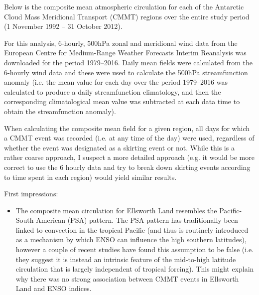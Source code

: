 Below is the composite mean atmospheric circulation for each of the Antarctic Cloud Mass Meridional Transport (CMMT) regions over the entire study period (1 November 1992 -- 31 October 2012).

For this analysis, 6-hourly, 500hPa zonal and meridional wind data from the European Centre for Medium-Range Weather Forecasts Interim Reanalysis \citep[ERA-Interim;][]{Dee2011} was downloaded for the period 1979--2016. Daily mean fields were calculated from the 6-hourly wind data and these were used to calculate the 500hPa streamfunction anomaly (i.e. the mean value for each day over the period 1979--2016 was calculated to produce a daily streamfunction climatology, and then the corresponding climatological mean value was subtracted at each data time to obtain the streamfunction anomaly).   

When calculating the composite mean field for a given region, all days for which a CMMT event was recorded (i.e. at any time of the day) were used, regardless of whether the event was designated as a skirting event or not. While this is a rather coarse approach, I suspect a more detailed approach (e.g. it would be more correct to use the 6 hourly data and try to break down skirting events according to time spent in each region) would yield similar results.

First impressions:
\begin{itemize}
\item The composite mean circulation for Ellsworth Land resembles the Pacific-South American (PSA) pattern. The PSA pattern has traditionally been linked to convection in the tropical Pacific (and thus is routinely introduced as a mechanism by which ENSO can influence the high southern latitudes), however a couple of recent studies \citep{Irving2016,OKane2017} have found this assumption to be false (i.e. they suggest it is instead an intrinsic feature of the mid-to-high latitude circulation that is largely independent of tropical forcing). This might explain why there was no strong association between CMMT events in Ellsworth Land and ENSO indices.
\end{itemize}
